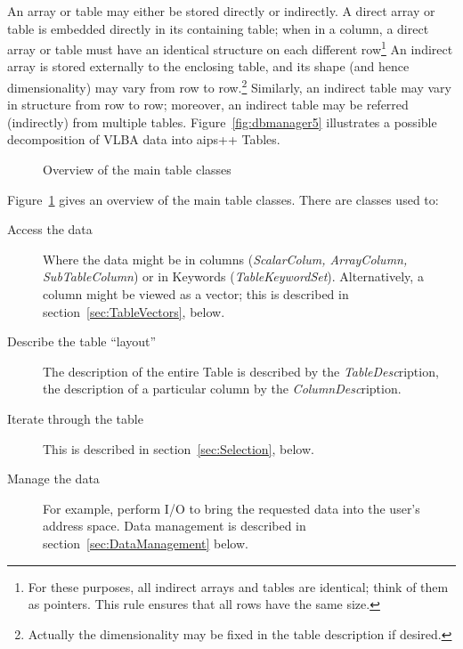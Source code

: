 An array or table may either be stored directly or indirectly. A
direct array or table is embedded directly in its containing table;
when in a column, a direct array or table must have an identical
structure on each different row\footnote{For these purposes, all
indirect arrays and tables are identical; think of them as
pointers. This rule ensures that all rows have the same size.}  An
indirect array is stored externally to the enclosing table, and its
shape (and hence dimensionality) may vary from row to row.\footnote{
Actually the dimensionality may be fixed in the table description if
desired.}  Similarly, an indirect table may vary in structure from row
to row; moreover, an indirect table may be referred (indirectly) from
multiple tables. Figure~\ref{fig:dbmanager5} illustrates a possible
decomposition of VLBA data into {\sc aips++} Tables.

\begin{figure}
\epsfverbosetrue
\epsfysize=7.0in
\caption{Overview of the main table classes}
\label{fig:DbTable}
\end{figure}

Figure~\ref{fig:DbTable} gives an overview of the main table
classes. There are classes used to:

\begin{description}

\item[Access the data]	Where the data might be in columns ({\em ScalarColum,
ArrayColumn, SubTableColumn}) or in Keywords
({\em TableKeywordSet}). Alternatively, a column might be viewed as a
vector; this is described in section~\ref{sec:TableVectors}, below.

\item[Describe the table ``layout''] The description of the entire
Table is described by the {\em TableDesc}ription, the description of a
particular column by the {\em ColumnDesc}ription.

\item[Iterate through the table] This is described in
section~\ref{sec:Selection}, below. 

\item[Manage the data] For example, perform I/O to bring the requested
data into the user's address space. Data management is described in
section~\ref{sec:DataManagement} below.
	
\end{description}

